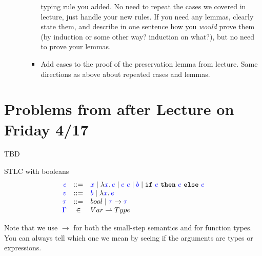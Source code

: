 \documentclass{article}
\newcommand{\meta}[1]{{\color{blue}#1}}
\newcommand{\stlc}{\textsc{STLC}}
\newcommand{\progtext}[1]{\ensuremath{\text{\ttfamily\bfseries #1}}}
\newcommand{\progif}{\progtext{if}}
\newcommand{\progthen}{\progtext{then}}
\newcommand{\progelse}{\progtext{else}}
\newcommand{\progtrue}{\progtext{true}}
\newcommand{\progfalse}{\progtext{false}}
\begin{document}
\begin{enumerate}[leftmargin=*,itemindent=*,start=1,label={{\bf Problem \arabic*}.},ref=\arabic*]
\begin{enumerate}[(a)]
\begin{itemize}
      typing rule you added. No need to repeat the cases we covered in lecture,
      just handle your new rules. If you need any lemmas, clearly state them,
      and describe in one sentence how you \emph{would} prove them (by induction
      or some other way? induction on what?), but no need to prove your lemmas.
    \item Add cases to the proof of the preservation lemma from lecture. Same
      directions as above about repeated cases and lemmas.
    \end{itemize}
  \end{enumerate}
\end{enumerate}

\section*{Problems from after Lecture on Friday 4/17}

TBD

\clearpage
  \noindent\stlc{} with booleans
  \[
    \begin{array}{rcl}
      \meta{e} & ::= & \meta{x} \mid \lambda \meta{x}.\,\meta{e} \mid \meta{e}\ \meta{e}\mid \meta{b} \mid \progif\ \meta{e}\ \progthen\ \meta{e}\ \progelse\ \meta{e}\\
      \meta{v} & ::= & \meta{b} \mid \lambda \meta{x}.\,\meta{e}\\
      \meta{\tau} & ::= & bool \mid \meta{\tau} \to \meta{\tau}\\
      \meta{\Gamma} & \in & Var \rightharpoonup Type
    \end{array}
  \]
  \boxed{\meta{e} \to \meta{e}}
  Note that we use $\to$ for both the small-step semantics and for function types.
  You can always tell which one we mean by seeing if the arguments are types or expressions.
\end{document}
